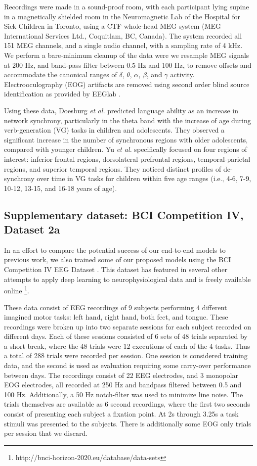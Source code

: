 \documentclass[fleqn,10pt]{wlscirep}
\begin{document}
Recordings were made in a sound-proof room, with each participant lying supine in a magnetically shielded room in the Neuromagnetic Lab of the Hospital for Sick Children in Toronto, using a CTF whole-head MEG system (MEG International Services Ltd., Coquitlam, BC, Canada). The system recorded all 151 MEG channels, and a single audio channel, with a sampling rate of 4 kHz. We perform a bare-minimum cleanup of the data were we resample MEG signals at 200 Hz, and band-pass filter between 0.5 Hz and 100 Hz, to remove offsets and accommodate the canonical ranges of $\delta$, $\theta$, $\alpha$, $\beta$, and $\gamma$ activity. Electrooculography (EOG) artifacts are removed using second order blind source identification as provided by EEGlab \cite{Delorme04eeglab}.

Using these data, Doesburg {\em et al.} \cite{Doesburg2016} predicted language ability as an increase in network synchrony, particularly in the theta band with the increase of age during verb-generation (VG) tasks in children and adolescents. They observed a significant increase in the number of synchronous regions with older adolescents, compared with younger children. Yu {\em et al.} \cite{Yu2014} specifically focused on four regions of interest: inferior frontal regions, dorsolateral prefrontal regions, temporal-parietal regions, and superior temporal regions. They noticed distinct profiles of de-synchrony over time in VG tasks for children within five age ranges (i.e., 4-6, 7-9, 10-12, 13-15, and 16-18 years of age).

\subsection*{Supplementary dataset: BCI Competition IV, Dataset 2a}

In an effort to compare the potential success of our end-to-end models to previous work, we also trained some of our proposed models using the BCI Competition IV EEG Dataset \cite{Tangermann2012}. This dataset has featured in several other attempts to apply deep learning to neurophysiological data  and is freely available online \footnote{http://bnci-horizon-2020.eu/database/data-sets}.

These data consist of EEG recordings of 9 subjects performing 4 different imagined motor tasks: left hand, right hand, both feet, and tongue. These recordings were broken up into two separate sessions for each subject recorded on different days. Each of these sessions consisted of 6 sets of 48 trials separated by a short break, where the 48 trials were 12 executions of each of the 4 tasks. Thus a total of 288 trials were recorded per session. One session is considered training data, and the second is used as evaluation requiring some carry-over performance between days. The recordings consist of 22 EEG electrodes, and 3 monopolar EOG electrodes, all recorded at 250 Hz and bandpass filtered between 0.5 and 100 Hz. Additionally, a 50 Hz notch-filter was used to minimize line noise. The trials themselves are available as 6 second recordings, where the first two seconds consist of presenting each subject a fixation point. At 2s through 3.25s a task stimuli was presented to the subjects. There is additionally some EOG only trials per session that we discard. 
\end{document}
